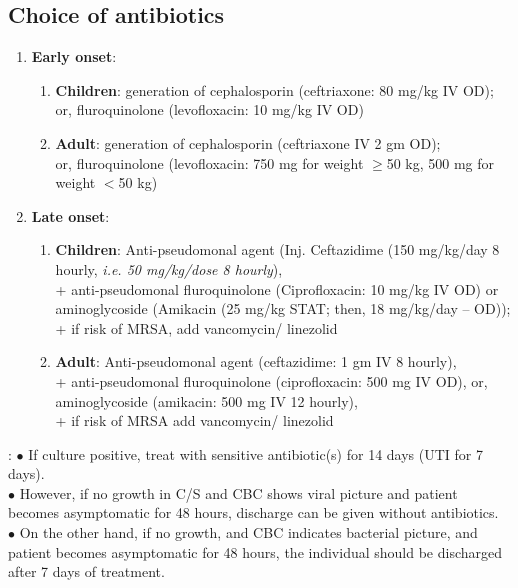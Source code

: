 \documentclass[11pt,a4paper]{report}
\begin{document}
\subsection{Choice of antibiotics}
\begin{enumerate}
	\item \textbf{Early onset}:
	\begin{enumerate}
		\item \textbf{Children}:  generation of cephalosporin (ceftriaxone: 80 mg/kg IV OD); \\
		or, fluroquinolone (levofloxacin: 10 mg/kg IV OD)
		\item \textbf{Adult}:  generation of cephalosporin (ceftriaxone IV 2 gm OD); \\
		or, fluroquinolone (levofloxacin: 750 mg for weight $\geq$50 kg, 500 mg for weight $<$50 kg)
	\end{enumerate}
	\item \textbf{Late onset}:
	\begin{enumerate}
		\item \textbf{Children}: Anti-pseudomonal agent (Inj. Ceftazidime (150 mg/kg/day 8 hourly, \textit{{\color{red}i.e. 50 mg/kg/dose 8 hourly}}), \\
		+ anti-pseudomonal fluroquinolone (Ciprofloxacin: 10 mg/kg IV OD) or aminoglycoside (Amikacin (25 mg/kg STAT; then, 18 mg/kg/day -- OD)); \\
		+ if risk of MRSA, add vancomycin/ linezolid 
		\item \textbf{Adult}: Anti-pseudomonal agent (ceftazidime: 1 gm IV 8 hourly), \\
		+ anti-pseudomonal fluroquinolone (ciprofloxacin: 500 mg IV OD), or, aminoglycoside (amikacin: 500 mg IV 12 hourly), \\
		+ if risk of MRSA add vancomycin/ linezolid 
	\end{enumerate}
\end{enumerate}

: 
$\bullet$ If culture positive, treat with sensitive antibiotic(s) for 14 days (UTI for 7 days). \\
$\bullet$ However, if no growth in C/S and CBC shows viral picture and patient becomes asymptomatic for 48 hours, discharge can be given without antibiotics. \\
$\bullet$ On the other hand, if no growth, and CBC indicates bacterial picture, and patient becomes asymptomatic for 48 hours, the individual should be discharged after 7 days of treatment.
\end{document}
